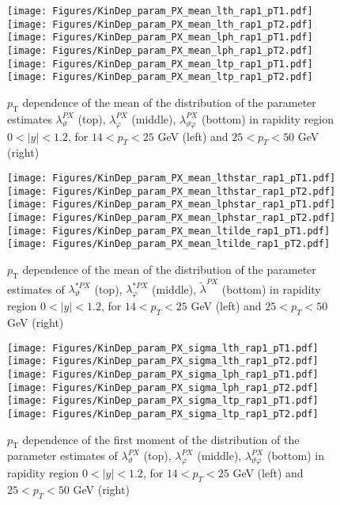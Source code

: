 \documentclass[12pt]{article}
\newcommand{\pT}{p_\mathrm{T}}
\newcommand{\absy}{\left |  y \right |}
\newcommand{\lamthPX}{\lambda^{\scriptscriptstyle PX}_\vartheta}
\newcommand{\lamphPX}{\lambda^{\scriptscriptstyle PX}_\varphi}
\newcommand{\lamthphPX}{\lambda^{\scriptscriptstyle PX}_{\vartheta \varphi}}
\newcommand{\lamtildePX}{\tilde{\lambda}^{\scriptscriptstyle PX}}
\newcommand{\lamthstarPX}{\lambda^{* \scriptscriptstyle PX}_\vartheta}
\newcommand{\lamphstarPX}{\lambda^{* \scriptscriptstyle PX}_\varphi}
\begin{document}



\begin{figure}[htbp]
\centering
\texttt{[image: Figures/KinDep\_param\_PX\_mean\_lth\_rap1\_pT1.pdf]}
\texttt{[image: Figures/KinDep\_param\_PX\_mean\_lth\_rap1\_pT2.pdf]}
\texttt{[image: Figures/KinDep\_param\_PX\_mean\_lph\_rap1\_pT1.pdf]}
\texttt{[image: Figures/KinDep\_param\_PX\_mean\_lph\_rap1\_pT2.pdf]}
\texttt{[image: Figures/KinDep\_param\_PX\_mean\_ltp\_rap1\_pT1.pdf]}
\texttt{[image: Figures/KinDep\_param\_PX\_mean\_ltp\_rap1\_pT2.pdf]}
\caption{$\pT$ dependence of the mean of the distribution of the parameter estimates $\lamthPX$ (top), $\lamphPX$ (middle), $\lamthphPX$ (bottom) in rapidity region $0<\absy<1.2$, for $14 < p_T < 25$ GeV (left) and
$25 < p_T < 50$ GeV (right)}
\end{figure}
\clearpage

\begin{figure}[htbp]
\centering
\texttt{[image: Figures/KinDep\_param\_PX\_mean\_lthstar\_rap1\_pT1.pdf]}
\texttt{[image: Figures/KinDep\_param\_PX\_mean\_lthstar\_rap1\_pT2.pdf]}
\texttt{[image: Figures/KinDep\_param\_PX\_mean\_lphstar\_rap1\_pT1.pdf]}
\texttt{[image: Figures/KinDep\_param\_PX\_mean\_lphstar\_rap1\_pT2.pdf]}
\texttt{[image: Figures/KinDep\_param\_PX\_mean\_ltilde\_rap1\_pT1.pdf]}
\texttt{[image: Figures/KinDep\_param\_PX\_mean\_ltilde\_rap1\_pT2.pdf]}
\caption{$\pT$ dependence of the mean of the distribution of the parameter estimates of $\lamthstarPX$ (top), $\lamphstarPX$ (middle), $\lamtildePX$ (bottom) in rapidity region $0<\absy<1.2$, for $14 < p_T < 25$ GeV (left) and
$25 < p_T < 50$ GeV (right)}
\end{figure}
\clearpage


\begin{figure}[htbp]
\centering
\texttt{[image: Figures/KinDep\_param\_PX\_sigma\_lth\_rap1\_pT1.pdf]}
\texttt{[image: Figures/KinDep\_param\_PX\_sigma\_lth\_rap1\_pT2.pdf]}
\texttt{[image: Figures/KinDep\_param\_PX\_sigma\_lph\_rap1\_pT1.pdf]}
\texttt{[image: Figures/KinDep\_param\_PX\_sigma\_lph\_rap1\_pT2.pdf]}
\texttt{[image: Figures/KinDep\_param\_PX\_sigma\_ltp\_rap1\_pT1.pdf]}
\texttt{[image: Figures/KinDep\_param\_PX\_sigma\_ltp\_rap1\_pT2.pdf]}
\caption{$\pT$ dependence of the first moment of the distribution of the parameter estimates of $\lamthPX$ (top), $\lamphPX$ (middle), $\lamthphPX$ (bottom) in rapidity region $0<\absy<1.2$, for $14 < p_T < 25$ GeV (left) and
$25 < p_T < 50$ GeV (right)}
\end{figure}
\clearpage
\end{document}
